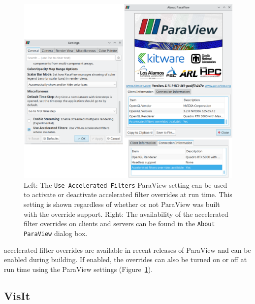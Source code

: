 \begin{figure}[htb]
  \includegraphics[width=\linewidth]{figures/pv-override-settings.png}
  \caption{
    Left: The \texttt{Use Accelerated Filters} ParaView setting can be used to activate or deactivate accelerated filter overrides at run time.
    This setting is shown regardless of whether or not ParaView was built with the override support.
    Right: The availability of the accelerated filter overrides on clients and servers can be found in the \texttt{About ParaView} dialog box.
  }
  \label{fig:paraview_settings}
\end{figure}

\vtkm accelerated filter overrides are available in recent releases of ParaView and can be enabled during building.
If enabled, the overrides can also be turned on or off at run time using the ParaView settings (Figure~\ref{fig:paraview_settings}).

\subsection{VisIt}

